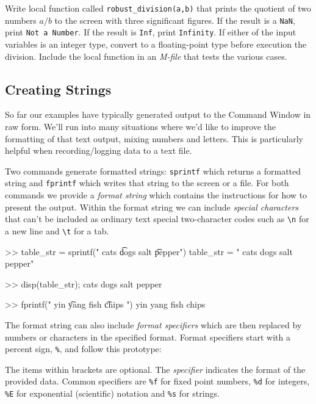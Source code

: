 \begin{ex}
    Write local function called \lstinline{robust_division(a,b)} that prints the quotient of two numbers $a/b$ to the screen with three significant figures. If the result is a \lstinline{NaN}, print \lstinline{Not a Number}.  If the result is \lstinline{Inf}, print \lstinline{Infinity}.  If either of the input variables is an integer type, convert to a floating-point type before execution the division.  Include the local function in an \emph{M-file} that tests the various cases.  
\end{ex}


\subsection{Creating Strings}

So far our examples have typically generated output to the Command Window in raw form.  We'll run into many situations where we'd like to improve the formatting of that text output, mixing numbers and letters.  This is particularly helpful when recording/logging data to a text file.

Two commands generate formatted strings: \lstinline{sprintf} which returns a formatted string 
and \lstinline{fprintf} which writes that string to the screen or a file.  For both commands we provide a \emph{format string} which contains the instructions for how to present the output.  Within the format string we can include \emph{special characters} that can't be included as ordinary text special two-character codes such as \lstinline{\n} for a new line and \lstinline{\t} for a tab.

\begin{code}
>> table_str = sprintf(" cats \t dogs \n salt \t pepper")
table_str = 
    " cats 	 dogs 
      salt 	 pepper"

>> disp(table_str);
 cats 	 dogs 
 salt 	 pepper

>> fprintf(" yin \t yang \n fish \t chips \n")
 yin 	 yang 
 fish 	 chips 
\end{code}

The format string can also include \emph{format specifiers} which are then replaced by numbers or characters in the specified format.  Format specifiers start with a percent sign, \lstinline{%}, and follow this prototype:
\begin{stdout}
\end{stdout}   
The items within brackets are optional.  The \emph{specifier} indicates the format of the provided data.  Common specifiers are \lstinline{%f} for fixed point numbers, \lstinline{%d} for integers, \lstinline{%E} for exponential (scientific) notation and \lstinline{%s} for strings.

